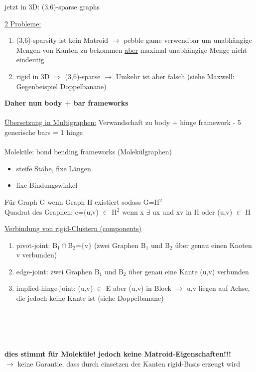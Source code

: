 \documentclass[12pt,a4paper]{article}
\begin{document}
jetzt in 3D: (3,6)-sparse graphs\\
\parbox{\linewidth}{
\underline{2 Probleme:}
\begin{enumerate}
	\item (3,6)-sparsity ist kein Matroid $\rightarrow$ pebble game verwendbar um unabhängige Mengen von Kanten zu bekommen \underline{aber} maximal unabhängige Menge nicht eindeutig
	\item rigid in 3D $\Rightarrow$ (3,6)-sparse $\rightarrow$ Umkehr ist aber falsch (siehe Maxwell: Gegenbeispiel Doppelbanane)
\end{enumerate}
}
\textbf{Daher nun body + bar frameworks}
\\\\
\underline{Übersetzung in Multigraphen:} Verwandschaft zu body +  hinge framework
 - 5 generische bars = 1 hinge\\
\\
Moleküle: bond bending frameworks (Molekülgraphen)
\begin{itemize}
	\item steife Stäbe, fixe Längen
	\item fixe Bindungswinkel
\end{itemize}

Für Graph G wenn Graph H existiert sodass G=H$^2$\\
Quadrat des Graphen: e=(u,v) $\in$ H$^2$ wenn x $\exists$ ux und xv in H oder (u,v) $\in$ H

\underline{Verbindung von rigid-Clustern (components)}
\begin{enumerate}
	\item pivot-joint: B$_1\cap$B$_2$=$\{$v$\}$ (zwei Graphen B$_1$ und B$_2$ über genau einen Knoten v verbunden)
	\item edge-joint: zwei Graphen B$_1$ und B$_2$ über genau eine Kante (u,v) verbunden
	\item implied-hinge-joint: (u,v) $\in$ E aber (u,v) in Block $\rightarrow$ u,v liegen auf Achse, die jedoch keine Kante ist (siehe Doppelbanane)
\end{enumerate}

\\\\
\\\\
\textbf{dies stimmt für Moleküle! jedoch keine Matroid-Eigenschaften!!!}\\
$\rightarrow$ keine Garantie, dass durch einsetzen der Kanten rigid-Basis erzeugt wird
\newpage
\end{document}
